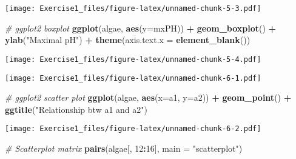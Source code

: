 \documentclass[
]{article}
\newenvironment{Shaded}{\begin{snugshade}}{\end{snugshade}}
\newcommand{\AttributeTok}[1]{\textcolor[rgb]{0.13,0.29,0.53}{#1}}
\newcommand{\CommentTok}[1]{\textcolor[rgb]{0.56,0.35,0.01}{\textit{#1}}}
\newcommand{\DecValTok}[1]{\textcolor[rgb]{0.00,0.00,0.81}{#1}}
\newcommand{\FunctionTok}[1]{\textcolor[rgb]{0.13,0.29,0.53}{\textbf{#1}}}
\newcommand{\NormalTok}[1]{#1}
\newcommand{\SpecialCharTok}[1]{\textcolor[rgb]{0.81,0.36,0.00}{\textbf{#1}}}
\newcommand{\StringTok}[1]{\textcolor[rgb]{0.31,0.60,0.02}{#1}}
\begin{document}
\texttt{[image: Exercise1\_files/figure-latex/unnamed-chunk-5-3.pdf]}

\begin{Shaded}
\begin{Highlighting}[]
\CommentTok{\# ggplot2 boxplot}
\FunctionTok{ggplot}\NormalTok{(algae, }\FunctionTok{aes}\NormalTok{(}\AttributeTok{y=}\NormalTok{mxPH)) }\SpecialCharTok{+}
\FunctionTok{geom\_boxplot}\NormalTok{() }\SpecialCharTok{+} \FunctionTok{ylab}\NormalTok{(}\StringTok{"Maximal pH"}\NormalTok{) }\SpecialCharTok{+} \FunctionTok{theme}\NormalTok{(}\AttributeTok{axis.text.x =} \FunctionTok{element\_blank}\NormalTok{())}
\end{Highlighting}
\end{Shaded}

\texttt{[image: Exercise1\_files/figure-latex/unnamed-chunk-5-4.pdf]}

\begin{Shaded}
\end{Shaded}

\texttt{[image: Exercise1\_files/figure-latex/unnamed-chunk-6-1.pdf]}

\begin{Shaded}
\begin{Highlighting}[]
\CommentTok{\# ggplot2 scatter plot}
\FunctionTok{ggplot}\NormalTok{(algae, }\FunctionTok{aes}\NormalTok{(}\AttributeTok{x=}\NormalTok{a1, }\AttributeTok{y=}\NormalTok{a2)) }\SpecialCharTok{+} 
\FunctionTok{geom\_point}\NormalTok{() }\SpecialCharTok{+} 
\FunctionTok{ggtitle}\NormalTok{(}\StringTok{"Relationship btw a1 and a2"}\NormalTok{)}
\end{Highlighting}
\end{Shaded}

\texttt{[image: Exercise1\_files/figure-latex/unnamed-chunk-6-2.pdf]}

\begin{Shaded}
\begin{Highlighting}[]
\CommentTok{\# Scatterplot matrix}
\FunctionTok{pairs}\NormalTok{(algae[, }\DecValTok{12}\SpecialCharTok{:}\DecValTok{16}\NormalTok{], }\AttributeTok{main =} \StringTok{"scatterplot"}\NormalTok{)}
\end{Highlighting}
\end{Shaded}
\end{document}
